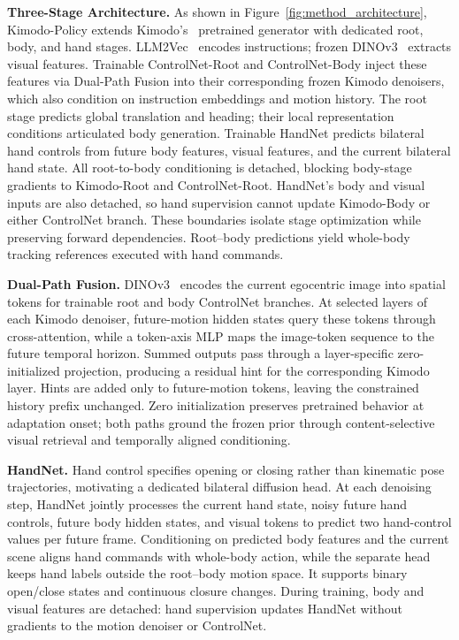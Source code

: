 \textbf{Three-Stage Architecture.}
As shown in Figure~\ref{fig:method_architecture}, Kimodo-Policy extends Kimodo's~\cite{kimodo} pretrained generator with dedicated root, body, and hand stages. LLM2Vec~\cite{behnamghader2024llm2veclargelanguagemodels} encodes instructions; frozen DINOv3~\cite{dinov3} extracts visual features. Trainable ControlNet-Root and ControlNet-Body inject these features via Dual-Path Fusion into their corresponding frozen Kimodo denoisers, which also condition on instruction embeddings and motion history. The root stage predicts global translation and heading; their local representation conditions articulated body generation. Trainable HandNet predicts bilateral hand controls from future body features, visual features, and the current bilateral hand state. All root-to-body conditioning is detached, blocking body-stage gradients to Kimodo-Root and ControlNet-Root. HandNet's body and visual inputs are also detached, so hand supervision cannot update Kimodo-Body or either ControlNet branch. These boundaries isolate stage optimization while preserving forward dependencies. Root--body predictions yield whole-body tracking references executed with hand commands.

\begin{samepage}
\textbf{Dual-Path Fusion.} DINOv3~\cite{dinov3} encodes the current egocentric image into spatial tokens for trainable root and body ControlNet branches. At selected layers of each Kimodo denoiser, future-motion hidden states query these tokens through cross-attention, while a token-axis MLP maps the image-token sequence to the future temporal horizon. Summed outputs pass through a layer-specific zero-initialized projection, producing a residual hint for the corresponding Kimodo layer. Hints are added only to future-motion tokens, leaving the constrained history prefix unchanged. Zero initialization preserves pretrained behavior at adaptation onset; both paths ground the frozen prior through content-selective visual retrieval and temporally aligned conditioning.\par
\end{samepage}

\textbf{HandNet.} Hand control specifies opening or closing rather than kinematic pose trajectories, motivating a dedicated bilateral diffusion head. At each denoising step, HandNet jointly processes the current hand state, noisy future hand controls, future body hidden states, and visual tokens to predict two hand-control values per future frame. Conditioning on predicted body features and the current scene aligns hand commands with whole-body action, while the separate head keeps hand labels outside the root--body motion space. It supports binary open/close states and continuous closure changes. During training, body and visual features are detached: hand supervision updates HandNet without gradients to the motion denoiser or ControlNet.

